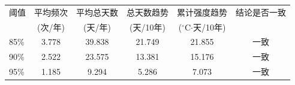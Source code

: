\begin{tabular}{lccccc}
\hline
阈值 & 平均频次 & 平均总天数 & 总天数趋势 & 累计强度趋势 & 结论是否一致 \\
 & (次/年) & (天/年) & (天/10年) & ($^\circ$C$\cdot$天/10年) & \\
\hline
85\% & 3.778 & 39.838 & 21.749 & 21.855 & 一致 \\
90\% & 2.522 & 23.575 & 13.381 & 15.176 & 一致 \\
95\% & 1.185 & 9.294 & 5.286 & 7.073 & 一致 \\
\hline
\end{tabular}
